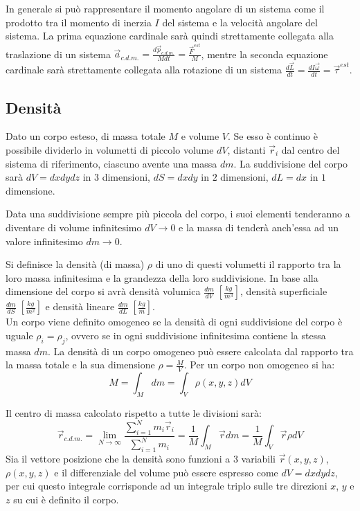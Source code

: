 \documentclass{article}
\numberwithin{equation}{subsection}
\begin{document}
In generale si può rappresentare il momento angolare di un sistema 
come il prodotto tra il momento di inerzia $I$ del sistema e la velocità angolare del sistema. 
La prima equazione cardinale sarà quindi strettamente collegata 
alla traslazione di un sistema $\vec{a}_{c.d.m.}=\displaystyle\frac{d\vec{p}_{c.d.m.}}{Mdt}=\frac{\vec{F}^{est}}{M}$, 
mentre la seconda equazione cardinale sarà strettamente 
collegata alla rotazione di un sistema $\displaystyle\frac{d\vec{L}}{dt}=\frac{dI\vec{\omega}}{dt}=\vec{\tau}^{est}$. 

\subsection{Densità}

Dato un corpo esteso, di massa totale $M$ e volume $V$. Se esso è continuo è possibile dividerlo 
in volumetti di piccolo volume $dV$, distanti $\vec{r}_i$ dal centro del sistema di 
riferimento, ciascuno avente una massa $dm$. La suddivisione del corpo sarà 
$dV=dxdydz$ in $3$ dimensioni, $dS=dxdy$ in $2$ dimensioni, 
$dL=dx$ in $1$ dimensione. 

Data una suddivisione sempre più piccola del corpo, i suoi elementi tenderanno a diventare di volume infinitesimo $dV\to 0$ e 
la massa di tenderà anch'essa ad un valore infinitesimo $dm\to 0$.

Si definisce la densità (di massa) $\rho$ di uno 
di questi volumetti il rapporto tra la loro massa infinitesima e la 
grandezza della loro suddivisione. In base alla dimensione 
del corpo si avrà densità volumica $\displaystyle\frac{dm}{dV}\;\left[\displaystyle\frac{kg}{m^3}\right]$, 
densità superficiale $\displaystyle\frac{dm}{dS}\;\left[\displaystyle\frac{kg}{m^2}\right]$ e densità 
lineare $\displaystyle\frac{dm}{dL}\;\left[\displaystyle\frac{kg}{m}\right]$. 
\\
Un corpo viene definito omogeneo se la densità di ogni 
suddivisione del corpo è uguale $\rho_i=\rho_j$, ovvero se in ogni suddivisione infinitesima contiene la stessa massa $dm$. 
La densità di un corpo omogeneo può essere calcolata dal rapporto 
tra la massa totale e la sua dimensione $\rho=\displaystyle\frac{M}{V}$. 
Per un corpo non omogeneo si ha: 
\begin{equation}
    M=\displaystyle\int_M dm=\int_V \rho(x,y,z) dV 
\end{equation}


Il centro di 
massa calcolato rispetto a tutte le divisioni sarà: 
\begin{equation}
    \vec{r}_{c.d.m.}=\lim_{N\to\infty}\displaystyle\frac{\sum_{i=1}^{N}m_i\vec{r}_i}{\sum_{i=1}^{N}m_i}=\displaystyle\frac{1}{M}\int_M\vec{r}dm=\displaystyle\frac{1}{M}\int_V\vec{r}\rho dV
\end{equation}
Sia il vettore posizione che la densità sono funzioni a $3$ variabili $\vec{r}(x,y,z)$, $\rho(x,y,z)$ e il differenziale del volume può essere espresso come $dV=dxdydz$, per cui questo integrale corrisponde 
ad un integrale triplo sulle tre direzioni $x$, $y$ e $z$ su cui è definito il corpo. 
\end{document}
